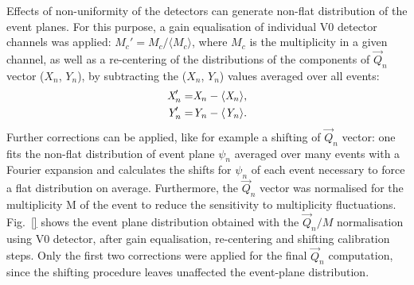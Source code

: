 Effects of non-uniformity of the detectors can generate 
non-flat distribution of the event planes.
For this purpose, a gain equalisation of individual 
V0 detector channels was applied: $M_c' = M_c / \langle M_c \rangle$, 
where $M_c$ is the multiplicity in a given channel, as
well as a re-centering of the distributions of the components
of $\vec{Q}_n$ vector ($X_n$, $Y_n$), by subtracting
the ($X_n$, $Y_n$) values averaged over all events:
\begin{equation}
\begin{split}
\emph{{X}}_n' =& \emph{X}_n - \langle \emph{X}_n \rangle,\\
\emph{{Y}}_n' = &\emph{Y}_n - \langle \emph{Y}_n \rangle.
\end{split}
\end{equation}
Further corrections can be applied, like for example
a shifting of $\vec{Q}_n$ vector: one fits the non-flat distribution of 
event plane $\psi_n$ averaged over many events with a Fourier expansion 
and calculates the shifts for $\psi_n$ of each event necessary to force
a flat distribution on average.
Furthermore, the $\vec{Q}_n$ vector was normalised for the
multiplicity M of the event to reduce the sensitivity to multiplicity
fluctuations. 
Fig.~\ref{} shows the event plane
distribution obtained with the $\vec{Q}_n/M$ normalisation using 
V0 detector, after gain equalisation, re-centering and shifting calibration steps. 
Only the first two corrections were applied for the final
$\vec{Q}_n$ computation, since the shifting procedure leaves
unaffected the event-plane distribution.




